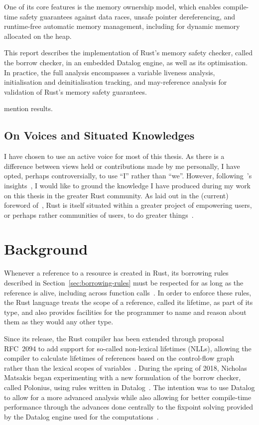 \documentclass[11pt,a4paper,twoside,openany]{report}
\newcommand{\fixme}[1] {{\color{red}#1}}
\begin{document}
One of its core features is the memory ownership model, which enables
compile-time safety guarantees against data races, unsafe pointer dereferencing,
and runtime-free automatic memory management, including for dynamic memory
allocated on the heap.

This report describes the implementation of Rust's memory safety checker, called
the borrow checker, in an embedded Datalog engine, as well as its optimisation.
In practice, the full analysis encompasses a variable liveness analysis,
initialisation and deinitialisation tracking, and may-reference analysis for
validation of Rust's memory safety guarantees.

\fixme{mention results.}

\section{On Voices and Situated Knowledges}\label{sec:situated-knowledge}

I have chosen to use an active voice for most of this thesis. As there is a
difference between views held or contributions made by me personally, I have
opted, perhaps controversially, to use ``I'' rather than ``we''. However,
following~\citeauthor{haraway}'s insights~\cite{haraway}, I would like to ground
the knowledge I have produced during my work on this thesis in the greater Rust
community. As laid out in the (current) foreword
of~, Rust is itself situated within a greater
project of empowering users, or perhaps rather communities of users, to do
greater things~\cite{nichols_rust_nodate}.

\chapter{Background}
Whenever a reference to a resource is created in Rust, its borrowing rules
described in Section~\ref{sec:borrowing-rules} must be respected for as long as
the reference is alive, including across function
calls~\cite{nichols_rust_nodate}. In order to enforce these rules, the Rust
language treats the scope of a reference, called its lifetime, as part of its
type, and also provides facilities for the programmer to name and reason about
them as they would any other type.


Since its release, the Rust compiler has been extended through proposal RFC~2094
to add support for so-called non-lexical lifetimes (NLLs), allowing the compiler
to calculate lifetimes of references based on the control-flow graph rather than
the lexical scopes of variables~\cite{noauthor_rfc_2019}. During the spring of
2018, Nicholas Matsakis began experimenting with a new formulation of the borrow
checker, called Polonius, using rules written in
Datalog~\cite{matsakis_alias-based_2018}. The intention was to use Datalog to
allow for a more advanced analysis while also allowing for better compile-time
performance through the advances done centrally to the fixpoint solving provided
by the Datalog engine used for the computations~\cite{datafrog}.
\end{document}
